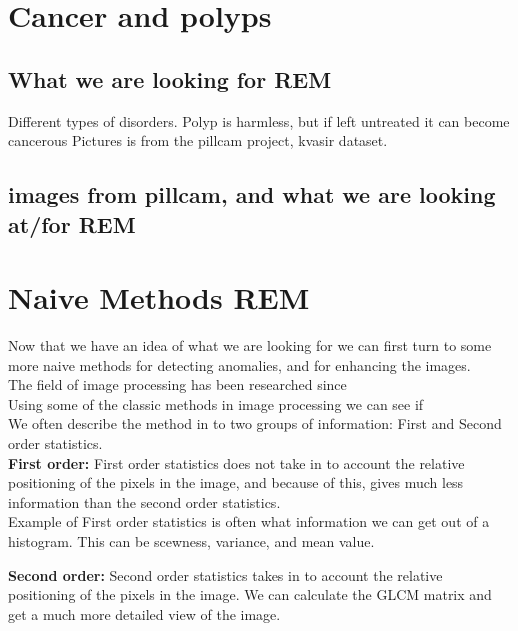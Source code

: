 	\section{Cancer and polyps}
	  \subsection{What we are looking for REM}
	  Different types of disorders.
	  Polyp is harmless, but if left untreated it can become cancerous
	  Pictures is from the pillcam project, kvasir dataset.
	  \subsection{images from pillcam, and what we are looking at/for REM}
	  
	
	\section{Naive Methods REM}
	  Now that we have an idea of what we are looking for we can first turn to some more naive methods for detecting anomalies, and for enhancing the images.\\
	  The field of image processing has been researched since\\ %
	  
	  Using some of the classic methods in image processing we can see if\\ %
	  
	  We often describe the method in to two groups of information: First and Second order statistics.\\
	  \textbf{First order:} First order statistics does not take in to account the relative positioning of the pixels in the image, and because of this, gives much less
	  information than the second order statistics.\\
	  Example of First order statistics is often what information we can get out of a histogram. This can be scewness, variance, and mean value.\\
	  
	  \vspace{10px}
	  
	  \textbf{Second order:} Second order statistics takes in to account the relative positioning of the pixels in the image. We can calculate the GLCM matrix and get a much more detailed 
	  view of the image. \\
	  
